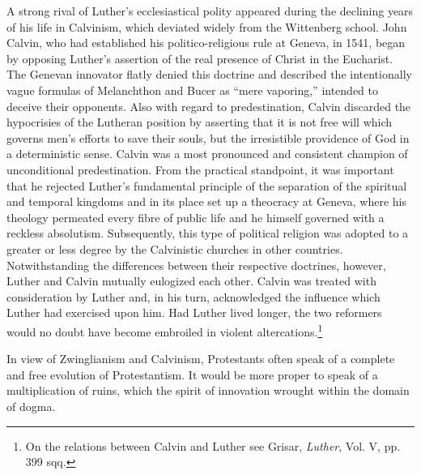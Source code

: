 A strong rival of Luther’s ecclesiastical polity appeared during the
declining years of his life in Calvinism, which deviated widely from
the Wittenberg school. John Calvin, who had established his politico-religious
rule at Geneva, in 1541, began by opposing Luther’s assertion of the real
presence of Christ in the Eucharist. The Genevan
innovator flatly denied this doctrine and described the intentionally
vague formulas of Melanchthon and Bucer as “mere vaporing,” intended to
deceive their opponents. Also with regard to predestination,
Calvin discarded the hypocrisies of the Lutheran position by
asserting that it is not free will which governs men’s efforts to save
their souls, but the irresistible providence of God in a deterministic
sense. Calvin was a most pronounced and consistent champion of
unconditional predestination. From the practical standpoint, it was
important that he rejected Luther’s fundamental principle of the
separation of the spiritual and temporal kingdoms and in its place set
up a theocracy at Geneva, where his theology permeated every fibre
of public life and he himself governed with a reckless absolutism.
Subsequently, this type of political religion was adopted to a greater
or less degree by the Calvinistic churches in other countries. Notwithstanding
the differences between their respective doctrines, however, Luther and
Calvin mutually eulogized each other. Calvin was
treated with consideration by Luther and, in his turn, acknowledged
the influence which Luther had exercised upon him. Had Luther
lived longer, the two reformers would no doubt have become embroiled in
violent altercations.\footnote{On the relations between Calvin and Luther see Grisar, \textit{Luther}, Vol. V, pp. 399 sqq.}

In view of Zwinglianism and Calvinism, Protestants often speak
of a complete and free evolution of Protestantism. It would be more
proper to speak of a multiplication of ruins, which the spirit of innovation
wrought within the domain of dogma.

